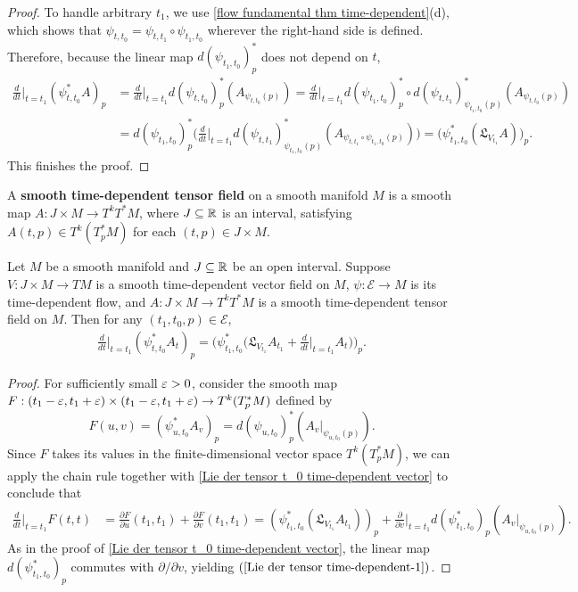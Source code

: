 \begin{proof}
To handle arbitrary $t_1$, we use \cref{flow fundamental thm time-dependent}(d), which shows that $\psi_{t,t_0}=\psi_{t,t_1}\circ\psi_{t_1,t_0}$ wherever the right-hand side is defined. Therefore, because the linear map $d(\psi_{t_1,t_0})_p^*$ does not depend on $t$,
\begin{align*}
\frac{d}{dt}\Big|_{t=t_1}(\psi_{t,t_0}^*A)_p&=\frac{d}{dt}\Big|_{t=t_1}d(\psi_{t,t_0})_p^*(A_{\psi_{t,t_0}(p)})=\frac{d}{dt}\Big|_{t=t_1}d(\psi_{t_1,t_0})_p^*\circ d(\psi_{t,t_1})_{\psi_{t_1,t_0}(p)}^*(A_{\psi_{t,t_0}(p)})\\
&=d(\psi_{t_1,t_0})_p^*\Big(\frac{d}{dt}\Big|_{t=t_1}d(\psi_{t,t_1})_{\psi_{t_1,t_0}(p)}^*(A_{\psi_{t,t_1}\circ\psi_{t_1,t_0}(p)})\Big)=\big(\psi_{t_1,t_0}^*(\mathfrak{L}_{V_{t_1}}A)\big)_p.
\end{align*}
This finishes the proof.
\end{proof}

A \textbf{smooth time-dependent tensor field} on a smooth manifold $M$ is a smooth map $A:J\times M\to T^kT^*M$, where $J\subseteq\mathbb{R}$ is an interval, satisfying $A(t,p)\in T^k(T_p^*M)$ for each $(t,p)\in J\times M$.

\begin{proposition}\label{Lie der tensor time-dependent}
Let $M$ be a smooth manifold and $J\subseteq\mathbb{R}$ be an open interval. Suppose $V:J\times M\to TM$ is a smooth time-dependent vector field on $M$, $\psi:\mathcal{E}\to M$ is its time-dependent flow, and $A:J\times M\to T^kT^*M$ is a smooth time-dependent tensor field on $M$. Then for any $(t_1,t_0,p)\in\mathcal{E}$,
\begin{align}\label{Lie der tensor time-dependent-1}
\frac{d}{dt}\Big|_{t=t_1}(\psi^*_{t,t_0}A_t)_p=\Big(\psi_{t_1,t_0}^*\Big(\mathfrak{L}_{V_{t_1}}A_{t_1}+\frac{d}{dt}\Big|_{t=t_1}A_t\Big)\Big)_p.
\end{align}
\end{proposition}
\begin{proof}
For sufficiently small $\varepsilon>0$, consider the smooth map $F:(t_1-\varepsilon,t_1+\varepsilon)\times(t_1-\varepsilon,t_1+\varepsilon)\to T^k(T_p^*M)$ defined by
\[F(u,v)=(\psi^*_{u,t_0}A_v)_p=d(\psi_{u,t_0})_p^*(A_v|_{\psi_{u,t_0}(p)}).\]
Since $F$ takes its values in the finite-dimensional vector space $T^k(T_p^*M)$, we can apply the chain rule together with \cref{Lie der tensor t_0 time-dependent vector} to conclude that
\begin{align*}
\frac{d}{dt}\Big|_{t=t_1}F(t,t)&=\frac{\partial F}{\partial u}(t_1,t_1)+\frac{\partial F}{\partial v}(t_1,t_1)=(\psi_{t_1,t_0}^*(\mathfrak{L}_{V_{t_1}}A_{t_1}))_p+\frac{\partial}{\partial v}\Big|_{t=t_1}d(\psi_{t_1,t_0}^*)_p(A_v|_{\psi_{u,t_0}(p)}).
\end{align*}
As in the proof of \cref{Lie der tensor t_0 time-dependent vector}, the linear map $d(\psi_{t_1,t_0}^*)_p$ commutes with $\partial/\partial v$, yielding $(\ref{Lie der tensor time-dependent-1})$.
\end{proof}

